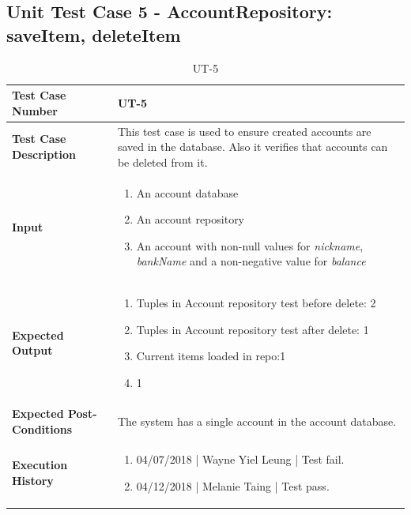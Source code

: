 \documentclass[12pt]{article}
\begin{document}
\subsection{Unit Test Case 5 - AccountRepository: saveItem, deleteItem}
\begin{table}[htbp]
\centering
\caption {UT-5}
\label{UT-5}
\begin{tabularx}{\textwidth}{ | l | X |}
\hline
\textbf{Test Case Number}      &  UT-5                     \\ \hline
\textbf{Test Case Description}    &  This test case is used to ensure created accounts are saved in the database. Also it verifies that accounts can be deleted from it.                 \\ \hline
\textbf{Input}         & 	\begin{enumerate}
  
\item An account database
\item An account repository
\item An account with non-null values for \textit{nickname}, \textit{bankName} and a non-negative value for \textit{balance}
  
\end{enumerate} \\ \hline

\textbf{Expected Output}     & \begin{enumerate}
\item Tuples in Account repository test before delete: 2 
\item Tuples in Account repository test after delete: 1 
\item Current items loaded in repo:1 
\item 1

\end{enumerate} \\ \hline
\textbf{Expected Post-Conditions} & The system has a single account in the account database. \\
\hline
\textbf{Execution History}   &  \begin{enumerate}
	\item 04/07/2018 | Wayne Yiel Leung | Test fail.
	\item 04/12/2018 | Melanie Taing | Test pass.
\end {enumerate} \\ \hline
\end{tabularx}
\end{table}
\clearpage
\end{document}
